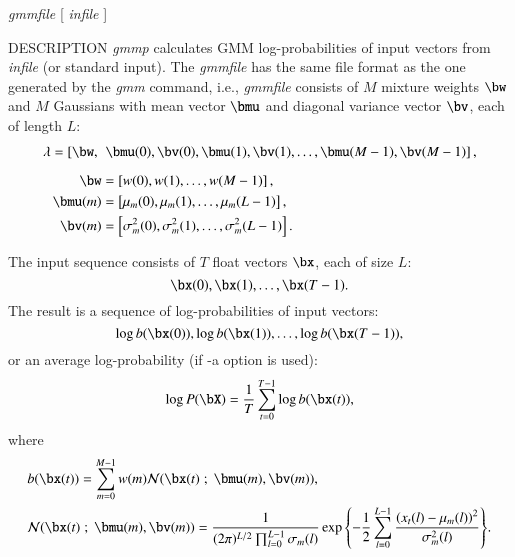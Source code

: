 \begin{synopsis}
\item [gmmp] [ --l $L$ ] [ --m $M$ ] [ --a ] {\em gmmfile} [ {\em infile} ]
\end{synopsis}

\begin{qsection}{DESCRIPTION}
{\em gmmp} calculates GMM log-probabilities of input vectors from {\em
infile} (or standard input). 
The {\em gmmfile} has the same file format as the one generated by the {\em gmm} command,
i.e., {\em gmmfile} consists of $M$ mixture weights
$\bw$ and $M$ Gaussians with mean vector $\bmu$ and diagonal variance vector
$\bv$, each of length $L$:
\begin{align}
 \lambda =
 \left[\bw,\right.&\left.\bmu(0),\bv(0), \bmu(1), \bv(1),
 \ldots, \bmu(M-1), \bv(M-1)\right],\notag\\[2mm]
 \bw &=\left[ w(0), w(1), \ldots, w(M-1) \right],\notag\\
 \bmu(m) &=\left[\mu_m(0), \mu_m(1), \ldots, \mu_m(L-1)\right],\notag\\
 \bv(m) &=\left[\sigma_m^2(0), \sigma_m^2(1), \ldots,
 \sigma_m^2(L-1)\right].\notag
\end{align}


The input sequence consists of $T$ float vectors $\bx$, each of
size $L$:
\begin{displaymath}
 \bx(0), \bx(1), \dots, \bx(T-1).
\end{displaymath}
The result is a sequence of log-probabilities of input vectors:
\begin{displaymath}
 \log b(\bx(0)), \log b(\bx(1)), \ldots, \log b(\bx(T-1)),
\end{displaymath}
or an average log-probability (if -a option is used):
\begin{displaymath}
 \log P(\bX) = \frac{1}{T}\sum_{t=0}^{T-1}\log b(\bx(t)),
\end{displaymath}
where
\begin{align}
 &b(\bx(t)) =\sum_{m=0}^{M-1}
 w(m){\cal N}(\bx(t) \; ; \; \bmu(m),\bv(m)),\notag\\
 &{\cal N}(\bx(t) \; ; \; \bmu(m),\bv(m))%
  =\frac{1}{(2\pi)^{L/2}\prod_{l=0}^{L-1}\sigma_m(l)}%
  \exp{\left\{-\frac{1}{2}%
    \sum_{l=0}^{L-1}
    \frac{\left(x_t(l)-\mu_m(l)\right)^2}%
    {\sigma_m^2(l)}\right\}}.\notag
\end{align}

\end{qsection}

\begin{options}
\end{options}

